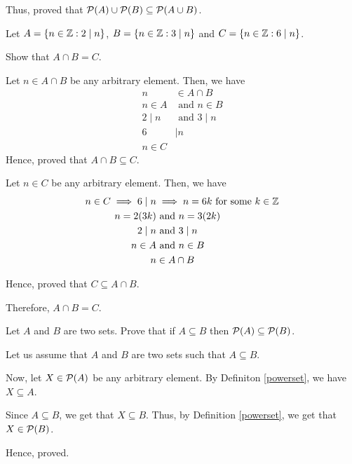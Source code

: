 	Thus, proved that $\mathcal{P}(A) \cup \mathcal{P}(B) \subseteq \mathcal{P}(A \cup B)$.
\es


\bp 
	Let $A = \{n \in \mathbb{Z} : 2 \mid n\}$, $B = \{ n \in \mathbb{Z} : 3 \mid n \}$ and $C = \{ n \in \mathbb{Z} : 6 \mid n \}$.

	Show that $A \cap B = C$.
\ep 

\bs
	Let $n \in A \cap B$ be any arbitrary element. Then, we have
	\begin{align}
		n &\in A \cap B \\
		n \in A &\text{ and } n \in B \\
		2 \mid n &\text{ and } 3 \mid n \\
		6 &\mid n \\
		n \in C
	\end{align}
	Hence, proved that $A \cap B \subseteq C$.

	Let $n \in C$ be any arbitrary element. Then, we have
	\begin{align}
		n \in C \implies 6 \mid n &\implies n = 6k \text{ for some } k \in \mathbb{Z} \\
		n = 2(3k) &\text{ and } n = 3(2k) \\
		2 \mid n &\text{ and } 3 \mid n \\
		n \in A &\text{ and } n \in B \\
		n &\in A \cap B
	\end{align}

	Hence, proved that $C \subseteq A \cap B$.

	Therefore, $A \cap B = C$.
\es

\bp 
	Let $A$ and $B$ are two sets. Prove that if $A \subseteq B$ then $\mathcal{P}(A) \subseteq \mathcal{P}(B)$.
\ep 

\bs
	Let us assume that $A$ and $B$ are two sets such that $A \subseteq B$.

	Now, let $X \in \mathcal{P}(A)$ be any arbitrary element.
	By Definiton \ref{powerset}, we have $X \subseteq A$. 

	Since $A \subseteq B$, we get that $X \subseteq B$. Thus, by Definition \ref{powerset}, we get that $X \in \mathcal{P}(B)$.

	Hence, proved.
\es

